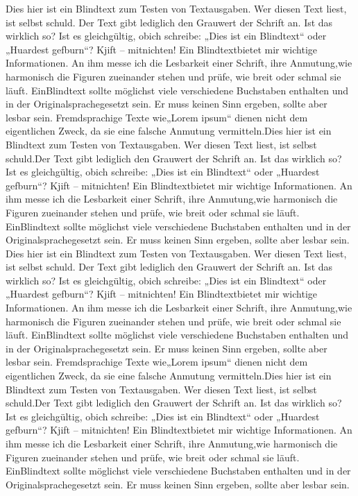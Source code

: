 Dies hier ist ein Blindtext zum Testen von Textausgaben. Wer diesen Text liest, ist selbst schuld.
Der Text gibt lediglich den Grauwert der Schrift an. Ist das wirklich so? Ist es gleichgültig, obich schreibe:
„Dies ist ein Blindtext“ oder „Huardest gefburn“? Kjift – mitnichten! Ein Blindtextbietet mir wichtige Informationen. 
An ihm messe ich die Lesbarkeit einer Schrift, ihre Anmutung,wie harmonisch die Figuren zueinander stehen und prüfe, 
wie breit oder schmal sie läuft. EinBlindtext sollte möglichst viele verschiedene Buchstaben enthalten und in der 
Originalsprachegesetzt sein. Er muss keinen Sinn ergeben, sollte aber lesbar sein. Fremdsprachige Texte wie„Lorem ipsum“ 
dienen nicht dem eigentlichen Zweck, da sie eine falsche Anmutung vermitteln.Dies hier ist ein Blindtext zum Testen von 
Textausgaben. Wer diesen Text liest, ist selbst schuld.Der Text gibt lediglich den Grauwert der Schrift an. Ist das 
wirklich so? Ist es gleichgültig, obich schreibe: „Dies ist ein Blindtext“ oder „Huardest gefburn“? Kjift – mitnichten! 
Ein Blindtextbietet mir wichtige Informationen. An ihm messe ich die Lesbarkeit einer Schrift, ihre Anmutung,wie 
harmonisch die Figuren zueinander stehen und prüfe, wie breit oder schmal sie läuft. EinBlindtext sollte möglichst viele 
verschiedene Buchstaben enthalten und in der Originalsprachegesetzt sein. Er muss keinen Sinn ergeben, sollte aber lesbar 
sein. Dies hier ist ein Blindtext zum Testen von Textausgaben. Wer diesen Text liest, ist selbst schuld.
Der Text gibt lediglich den Grauwert der Schrift an. Ist das wirklich so? Ist es gleichgültig, obich schreibe:
„Dies ist ein Blindtext“ oder „Huardest gefburn“? Kjift – mitnichten! Ein Blindtextbietet mir wichtige Informationen. 
An ihm messe ich die Lesbarkeit einer Schrift, ihre Anmutung,wie harmonisch die Figuren zueinander stehen und prüfe, 
wie breit oder schmal sie läuft. EinBlindtext sollte möglichst viele verschiedene Buchstaben enthalten und in der 
Originalsprachegesetzt sein. Er muss keinen Sinn ergeben, sollte aber lesbar sein. Fremdsprachige Texte wie„Lorem ipsum“ 
dienen nicht dem eigentlichen Zweck, da sie eine falsche Anmutung vermitteln.Dies hier ist ein Blindtext zum Testen von 
Textausgaben. Wer diesen Text liest, ist selbst schuld.Der Text gibt lediglich den Grauwert der Schrift an. Ist das 
wirklich so? Ist es gleichgültig, obich schreibe: „Dies ist ein Blindtext“ oder „Huardest gefburn“? Kjift – mitnichten! 
Ein Blindtextbietet mir wichtige Informationen. An ihm messe ich die Lesbarkeit einer Schrift, ihre Anmutung,wie 
harmonisch die Figuren zueinander stehen und prüfe, wie breit oder schmal sie läuft. EinBlindtext sollte möglichst viele 
verschiedene Buchstaben enthalten und in der Originalsprachegesetzt sein. Er muss keinen Sinn ergeben, sollte aber lesbar 
sein.


